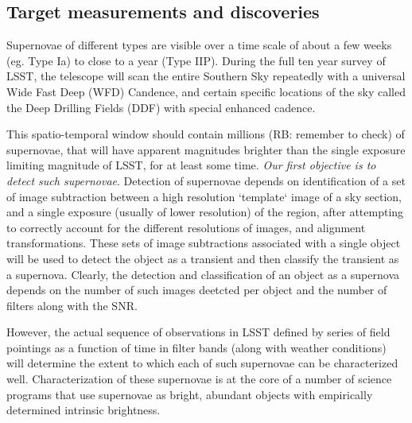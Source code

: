 
\subsection{Target measurements and discoveries}
\label{sec:keyword:targets}


Supernovae of different types are visible over a time scale of about a few 
weeks (eg. Type Ia) to close to a year (Type IIP). During the full ten year
 survey of LSST, the telescope will scan the entire Southern Sky repeatedly
 with a universal Wide Fast Deep (WFD) Candence, and certain specific locations
of the sky called the Deep Drilling Fields (DDF) with special enhanced cadence. 

This spatio-temporal window should contain millions (RB: remember to check) of supernovae, that will have apparent magnitudes brighter than the single exposure limiting magnitude of LSST, for at least some time. {\emph{Our first objective is to detect such supernovae}}. Detection of supernovae depends on identification
 of a set of image subtraction between a high resolution `template` image of a
 sky section, and a single exposure (usually of lower resolution) of the region,
 after attempting to correctly account for the different resolutions of images, and alignment transformations. These sets of image subtractions associated
 with a single object will be used to detect the object as a transient and then
classify the transient as a supernova. Clearly, the detection and classification of an object as a supernova depends on the number of such images deetcted per object and the number of filters along with the SNR. 
 
 However, the actual sequence of observations in LSST
defined by series of field pointings as a function of time in filter bands
 (along with weather conditions) will determine the extent to which each of such
supernovae can be characterized well. 
Characterization of these supernovae is at
 the core of a number of science programs that use supernovae as bright, abundant
 objects with empirically determined intrinsic brightness.




